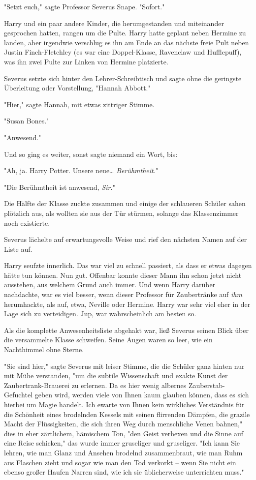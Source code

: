 {"Setzt euch," sagte Professor Severus Snape. "Sofort."

Harry und ein paar andere Kinder, die herumgestanden und miteinander gesprochen hatten, rangen um die Pulte. Harry hatte geplant neben Hermine zu landen, aber irgendwie verschlug es ihn am Ende an das nächste freie Pult neben Justin Finch-Fletchley (es war eine Doppel-Klasse, Ravenclaw und Hufflepuff), was ihn zwei Pulte zur Linken von Hermine platzierte.

Severus setzte sich hinter den Lehrer-Schreibtisch und sagte ohne die geringste Überleitung oder Vorstellung, "Hannah Abbott."

"Hier," sagte Hannah, mit etwas zittriger Stimme.

"Susan Bones."

"Anwesend."

Und so ging es weiter, sonst sagte niemand ein Wort, bis:

"Ah, ja. Harry Potter. Unsere neue… \emph{Berühmtheit.}"

"Die Berühmtheit ist anwesend, \emph{Sir.}"

Die Hälfte der Klasse zuckte zusammen und einige der schlaueren Schüler sahen plötzlich aus, als wollten sie aus der Tür stürmen, solange das Klassenzimmer noch existierte.

Severus lächelte auf erwartungsvolle Weise und rief den nächsten Namen auf der Liste auf.

Harry seufzte innerlich. Das war viel zu schnell passiert, als dass er etwas dagegen hätte tun können. Nun gut. Offenbar konnte dieser Mann ihn schon jetzt nicht ausstehen, aus welchem Grund auch immer. Und wenn Harry darüber nachdachte, war es viel besser, wenn dieser Professor für Zaubertränke auf \emph{ihm} herumhackte, als auf, etwa, Neville oder Hermine. Harry war sehr viel eher in der Lage sich zu verteidigen. Jup, war wahrscheinlich am besten so.

Als die komplette Anwesenheitsliste abgehakt war, ließ Severus seinen Blick über die versammelte Klasse schweifen. Seine Augen waren so leer, wie ein Nachthimmel ohne Sterne.

"Sie sind hier," sagte Severus mit leiser Stimme, die die Schüler ganz hinten nur mit Mühe verstanden, "um die subtile Wissenschaft und exakte Kunst der Zaubertrank-Brauerei zu erlernen. Da es hier wenig albernes Zauberstab-Gefuchtel geben wird, werden viele von Ihnen kaum glauben können, dass es sich hierbei um Magie handelt. Ich ewarte von Ihnen kein wirkliches Verständnis für die Schönheit eines brodelnden Kessels mit seinen flirrenden Dämpfen, die grazile Macht der Flüssigkeiten, die sich ihren Weg durch menschliche Venen bahnen," dies in eher zärtlichem, hämischem Ton, "den Geist verhexen und die Sinne auf eine Reise schicken," das wurde immer gruseliger und gruseliger. "Ich kann Sie lehren, wie man Glanz und Ansehen brodelnd zusammenbraut, wie man Ruhm aus Flaschen zieht und sogar wie man den Tod verkorkt -- wenn Sie nicht ein ebenso großer Haufen Narren sind, wie ich sie üblicherweise unterrichten muss."

}
